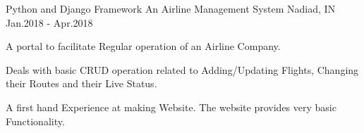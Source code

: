 \begin{cventries}

\cventry
{Python and Django Framework} %
{An Airline Management System} %
{Nadiad, IN} %
{Jan.2018 - Apr.2018} %
{ %
\begin{cvitems}
\item {A portal to facilitate Regular operation of an Airline Company.}
\item {Deals with basic CRUD operation related to Adding/Updating Flights, Changing their Routes and their Live Status.}
\item {A first hand Experience at making Website. The website provides very basic Functionality.}
\end{cvitems}
}


\end{cventries}